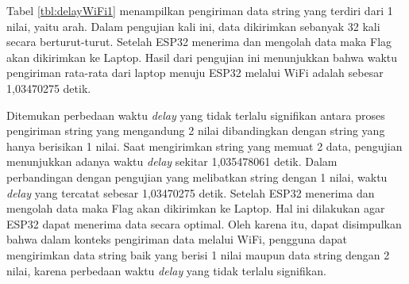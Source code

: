 Tabel \ref{tbl:delayWiFi1} menampilkan pengiriman data string yang terdiri dari 1 nilai, yaitu arah. Dalam pengujian kali ini, data dikirimkan sebanyak 32 kali secara berturut-turut. Setelah ESP32 menerima dan mengolah data maka Flag akan dikirimkan ke Laptop. Hasil dari pengujian ini menunjukkan bahwa waktu pengiriman rata-rata dari laptop menuju ESP32 melalui WiFi adalah sebesar 1,03470275 detik.

Ditemukan perbedaan waktu \emph{delay} yang tidak terlalu signifikan antara proses pengiriman string yang mengandung 2 nilai dibandingkan dengan string yang hanya berisikan 1 nilai. Saat mengirimkan string yang memuat 2 data, pengujian menunjukkan adanya waktu \emph{delay} sekitar 1,035478061 detik. Dalam perbandingan dengan pengujian yang melibatkan string dengan 1 nilai, waktu \emph{delay} yang tercatat sebesar 1,03470275 detik. Setelah ESP32 menerima dan mengolah data maka Flag akan dikirimkan ke Laptop. Hal ini dilakukan agar ESP32 dapat menerima data secara optimal. Oleh karena itu, dapat disimpulkan bahwa dalam konteks pengiriman data melalui WiFi, pengguna dapat mengirimkan data string baik yang berisi 1 nilai maupun data string dengan 2 nilai, karena perbedaan waktu \emph{delay} yang tidak terlalu signifikan.

